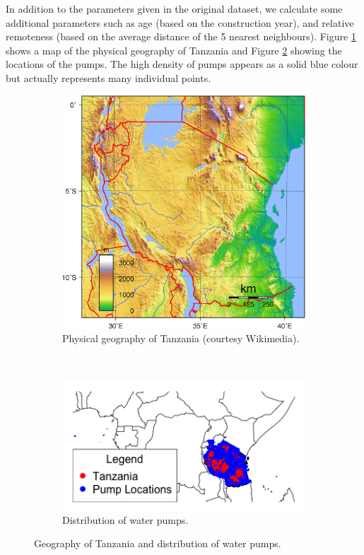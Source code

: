 \documentclass{article} %
\begin{document}
In addition to the parameters given in the original dataset, we calculate some additional parameters such as age (based on the construction year), and relative remoteness (based on the average distance of the 5 nearest neighbours). Figure \ref{fig:map-phys} shows a map of the physical geography of Tanzania and Figure \ref{fig:map-points} showing the locations of the pumps. The high density of pumps appears as a solid blue colour but actually represents many individual points.

\begin{figure}
  \centering
  \begin{subfigure}[b]{0.5\textwidth}
    \centering
    \includegraphics[width=\textwidth]{figures/Tanzania}
    \caption{Physical geography of Tanzania (courtesy Wikimedia).}
    \label{fig:map-phys}
  \end{subfigure}~\begin{subfigure}[b]{0.5\textwidth}
    \centering
    \includegraphics[width=\textwidth]{figures/PumpMap}
    \caption{Distribution of water pumps.}
    \label{fig:map-points}
  \end{subfigure}
  \caption{Geography of Tanzania and distribution of water pumps.}
  \label{fig:map}
\end{figure}
\end{document}
